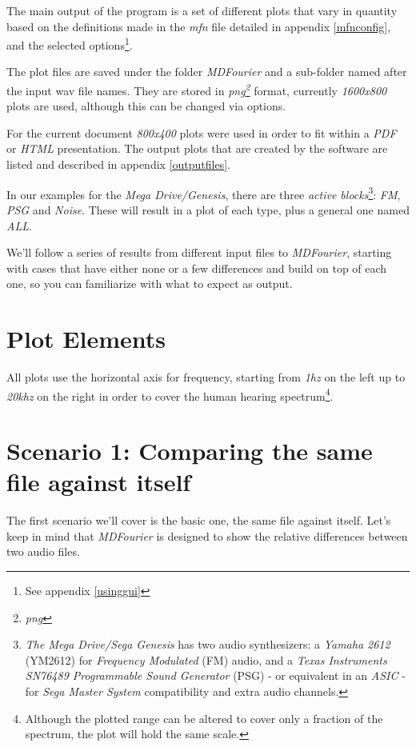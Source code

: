 \documentclass[10pt,a4paper]{report}
\newcommand{\define}[1]{\textit{\acrshort{#1}\footnote{\textit{\acrlong{#1}}}}}
\newcommand{\fhz}[1]{\textit{#1\acrshort{hz}}}
\newcommand{\fkhz}[1]{\textit{#1\acrshort{khz}}}
\begin{document}
The main output of the program is a set of different plots that vary in quantity based on the definitions made in the \textit{mfn} file detailed in appendix \ref{mfnconfig}, and the selected options\footnote{See appendix \ref{usinggui}}.

The plot files are saved under the folder \textit{MDFourier} and a sub-folder named after the input \acrshort{wav} file names. They are stored in \define{png} format, currently \textit{1600x800} plots are used, although this can be changed via options. 

For the current document \textit{800x400} plots were used in order to fit within a \textit{PDF} or \textit{HTML} presentation. The output plots that are created by the software are listed and described in appendix \ref{outputfiles}.

In our examples for the \textit{Mega Drive/Genesis}, there are three \textit{active blocks}\footnote{\textit{The Mega Drive/Sega Genesis} has two audio synthesizers: a \textit{Yamaha 2612} (YM2612) for \textit{Frequency Modulated} (FM) audio, and a \textit{Texas Instruments SN76489 Programmable Sound Generator} (PSG)  - or equivalent in an \textit{ASIC} - for \textit{Sega Master System} compatibility and extra audio channels. }: \textit{FM}, \textit{PSG} and \textit{Noise}. These will result in a plot of each type, plus a general one named \textit{ALL}.

We'll follow a series of results from different input files to \textit{MDFourier}, starting with cases that have either none or a few differences and build on top of each one, so you can familiarize with what to expect as output.

\section{Plot Elements}

All plots use the horizontal axis for frequency, starting from \fhz{1} on the left up to \fkhz{20} on the right in order to cover the human hearing spectrum\footnote{Although the plotted range can be altered to cover only a fraction of the spectrum, the plot will hold the same scale.}.

\section{Scenario 1: Comparing the same file against itself}
\label{scenario1}

The first scenario we'll cover is the basic one, the same file against itself. Let's keep in mind that \textit{MDFourier} is designed to show the relative differences between two audio files.
\end{document}

